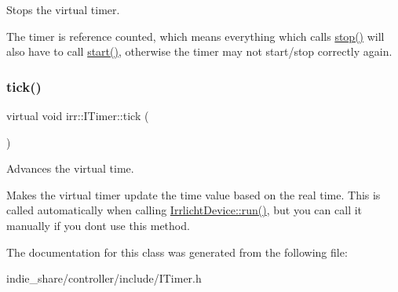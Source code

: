 Stops the virtual timer. 

The timer is reference counted, which means everything which calls \hyperlink{classirr_1_1ITimer_a649e7294fafc6e6de00f9a4dc6894c16}{stop()} will also have to call \hyperlink{classirr_1_1ITimer_a9467dc5a72de3869712715d0473c9697}{start()}, otherwise the timer may not start/stop correctly again. \mbox{\label{classirr_1_1ITimer_a50ee793711cace4410e1f9c9e1ce20c6}} 
\subsubsection{\texorpdfstring{tick()}{tick()}}
{\footnotesize\ttfamily virtual void irr\+::\+I\+Timer\+::tick (\begin{DoxyParamCaption}{ }\end{DoxyParamCaption})\hspace{0.3cm}{\ttfamily [pure virtual]}}



Advances the virtual time. 

Makes the virtual timer update the time value based on the real time. This is called automatically when calling \hyperlink{classirr_1_1IrrlichtDevice_a0489f8151dc43f6f41503ffb5a160b35}{Irrlicht\+Device\+::run()}, but you can call it manually if you don\textquotesingle{}t use this method. 

The documentation for this class was generated from the following file\+:\begin{DoxyCompactItemize}
\item 
indie\+\_\+share/controller/include/I\+Timer.\+h\end{DoxyCompactItemize}
